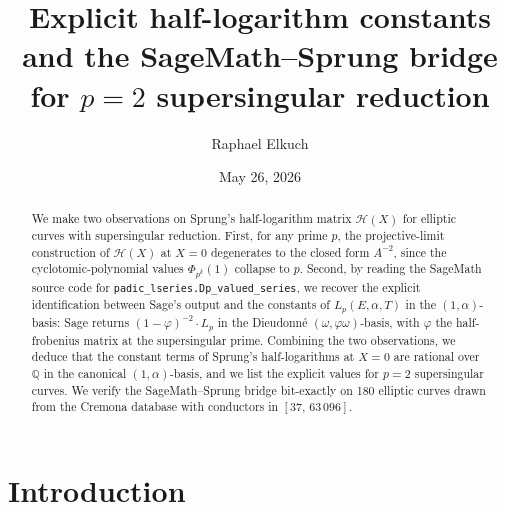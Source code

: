 \documentclass[11pt,a4paper]{amsart}
\title[Half-logarithm constants and the SageMath bridge at $p=2$]{Explicit half-logarithm constants and the SageMath--Sprung bridge for $p=2$ supersingular reduction}
\author{Raphael Elkuch}
\date{May 26, 2026}
\theoremstyle{definition}
\newcommand{\Q}{\mathbb{Q}}
\newcommand{\Hcal}{\mathcal{H}}
\begin{document}
\begin{abstract}
We make two observations on Sprung's half-logarithm matrix $\Hcal(X)$ for elliptic curves with supersingular reduction. First, for any prime $p$, the projective-limit construction of $\Hcal(X)$ at $X=0$ degenerates to the closed form $A^{-2}$, since the cyclotomic-polynomial values $\Phi_{p^k}(1)$ collapse to $p$. Second, by reading the SageMath source code for \texttt{padic\_lseries.Dp\_valued\_series}, we recover the explicit identification between Sage's output and the constants of $L_p(E, \alpha, T)$ in the $(1, \alpha)$-basis: Sage returns $(1-\varphi)^{-2}\cdot L_p$ in the Dieudonn\'e $(\omega, \varphi\omega)$-basis, with $\varphi$ the half-frobenius matrix at the supersingular prime. Combining the two observations, we deduce that the constant terms of Sprung's half-logarithms at $X=0$ are rational over $\Q$ in the canonical $(1, \alpha)$-basis, and we list the explicit values for $p=2$ supersingular curves. We verify the SageMath--Sprung bridge bit-exactly on 180 elliptic curves drawn from the Cremona database with conductors in $[37,\,63\,096]$.
\end{abstract}

\maketitle

\section{Introduction}\label{sec:intro}
\end{document}
